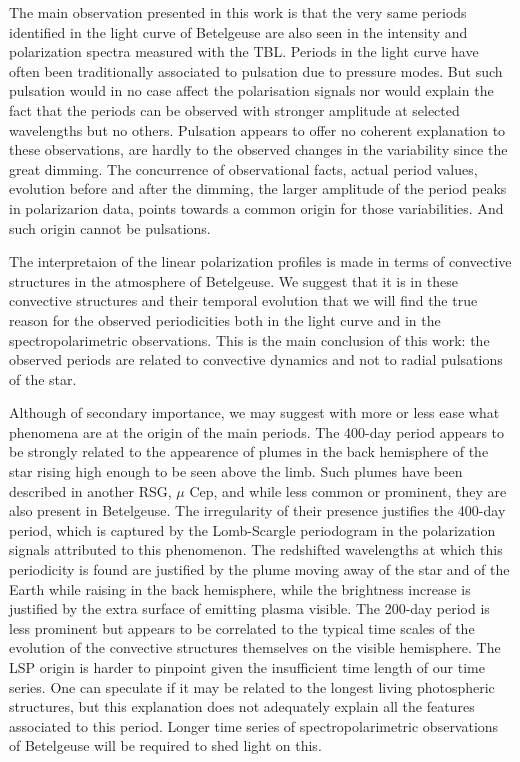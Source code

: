 \documentclass{aa}
\begin{document}
The main observation  presented in this work is that the very same periods identified in the light curve of Betelgeuse are also seen in the intensity and polarization
spectra measured with the TBL. Periods in the light curve have often been traditionally associated to pulsation due to pressure modes. But 
such pulsation would in no case affect the polarisation signals nor would explain the fact that the periods can be observed with stronger 
amplitude at selected wavelengths but no others.  Pulsation appears to offer no coherent explanation to these observations, are hardly to the 
observed changes in the variability since the great dimming.  The concurrence of observational facts, actual period values, evolution before 
and after the dimming, the larger amplitude of the period peaks in polarizarion data, points towards a common origin for those variabilities. 
And such origin cannot be pulsations.

The interpretaion of the linear polarization profiles is made in terms of convective structures in the atmosphere of Betelgeuse. We suggest 
that it is in these convective structures and their temporal evolution that we will find the true reason for the observed periodicities both 
in the light curve and in the spectropolarimetric observations. This is the main conclusion of this work: the observed periods are related 
to convective dynamics and not to radial pulsations of the star.

Although of secondary importance, we may suggest with more or less ease what phenomena are at the origin of the main periods. The 400-day period 
appears to be strongly related to the appearence of plumes in the back hemisphere of the star rising high enough to be seen above the limb.
Such plumes have been described in another RSG, $\mu$ Cep, and while less common or prominent, they are also present in Betelgeuse. The irregularity 
of their presence justifies the 400-day period, which is captured by the Lomb-Scargle periodogram in the polarization signals attributed to 
this phenomenon. The redshifted wavelengths at which this periodicity is found are justified by the plume moving away of the star and of the Earth while 
raising in the back hemisphere, while the brightness increase is justified by the extra surface of emitting plasma visible. The 200-day period is less 
prominent but appears to be correlated to the typical time scales of the evolution of the convective structures themselves on the visible hemisphere. 
The LSP origin is harder to pinpoint given the insufficient time length of our time series. One can speculate if it may be related to the 
longest living photospheric structures, but this explanation does not adequately explain all the features associated to this period. Longer time 
series of spectropolarimetric observations of Betelgeuse will be required to shed light on this.
\end{document}
